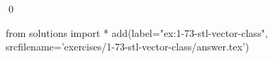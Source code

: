 
\begin{ex}
  \label{ex:1-73-stl-vector-class}
  
  \qed
\end{ex}
\begin{python0}
from solutions import *
add(label="ex:1-73-stl-vector-class",
    srcfilename='exercises/1-73-stl-vector-class/answer.tex')
\end{python0}
